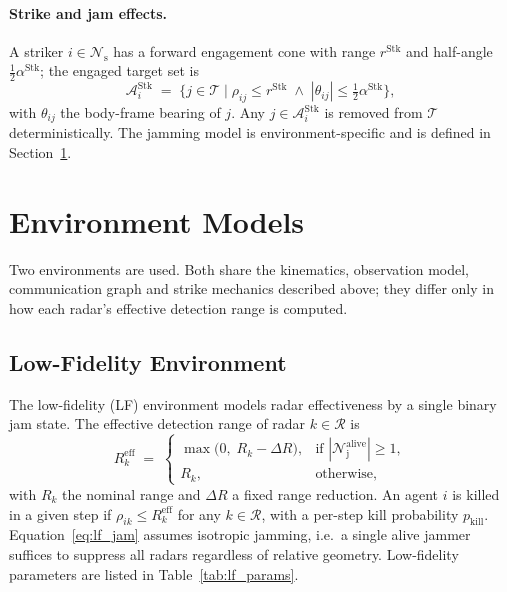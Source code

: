 \paragraph{Strike and jam effects.}
A striker $i\in\mathcal{N}_{\mathrm{s}}$ has a forward engagement cone with
range $r^{\mathrm{Stk}}$ and half-angle $\tfrac{1}{2}\alpha^{\mathrm{Stk}}$;
the engaged target set is
\begin{equation}
\mathcal{A}_i^{\mathrm{Stk}} \;=\; \bigl\{ j\in\mathcal{T}\;\bigl|\;
\rho_{ij}\le r^{\mathrm{Stk}} \;\wedge\;
|\theta_{ij}|\le\tfrac{1}{2}\alpha^{\mathrm{Stk}}\bigr\},
\label{eq:strike_set}
\end{equation}
with $\theta_{ij}$ the body-frame bearing of $j$. Any $j\in\mathcal{A}_i^{\mathrm{Stk}}$
is removed from $\mathcal{T}$ deterministically. The jamming model is
environment-specific and is defined in Section~\ref{sec:envs}.

\section{Environment Models}
\label{sec:envs}

Two environments are used. Both share the kinematics, observation model,
communication graph and strike mechanics described above; they differ only in
how each radar's effective detection range is computed.

\subsection{Low-Fidelity Environment}
\label{sec:lf_env}

The low-fidelity (LF) environment models radar effectiveness by a single
binary jam state. The effective detection range of radar $k\in\mathcal{R}$ is
\begin{equation}
R^{\mathrm{eff}}_k \;=\;
\begin{cases}
\max\!\bigl(0,\;R_k - \Delta R\bigr), & \text{if } |\mathcal{N}_{\mathrm{j}}^{\mathrm{alive}}|\ge 1,\\[2pt]
R_k, & \text{otherwise,}
\end{cases}
\label{eq:lf_jam}
\end{equation}
with $R_k$ the nominal range and $\Delta R$ a fixed range reduction. An agent
$i$ is killed in a given step if
$\rho_{ik}\le R^{\mathrm{eff}}_k$ for any $k\in\mathcal{R}$, with a per-step
kill probability $p_{\mathrm{kill}}$. Equation~\eqref{eq:lf_jam} assumes
isotropic jamming, i.e.\ a single alive jammer suffices to suppress all
radars regardless of relative geometry. Low-fidelity parameters are
listed in Table~\ref{tab:lf_params}.

